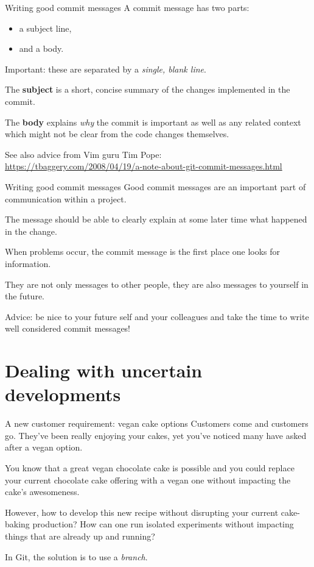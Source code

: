 \documentclass{git_course}
\begin{document}
\begin{frame}[fragile]{Writing good commit messages}
    A commit message has two parts:
    \begin{itemize}
        \item a subject line,
        \item and a body.
    \end{itemize}
    Important: these are separated by a \emph{single, blank line}.

    The \textbf{subject} is a short, concise summary of the changes
    implemented in the commit.

    The \textbf{body} explains \emph{why} the commit is important as well as
    any related context which might not be clear from the code changes
    themselves.

    See also advice from Vim guru Tim Pope:\\
    {\footnotesize \url{https://tbaggery.com/2008/04/19/a-note-about-git-commit-messages.html}}
\end{frame}

\begin{frame}[fragile]{Writing good commit messages}
    Good commit messages are an important part of communication within a
    project.

    The message should be able to clearly explain at some later time what
    happened in the change.

    When problems occur, the commit message is the first place one looks for
    information.

    They are not only messages to other people, they are also messages to
    yourself in the future.

    Advice: be nice to your future self and your colleagues and take the
    time to write well considered commit messages!
\end{frame}

\section{Dealing with uncertain developments}

\begin{frame}[fragile]{A new customer requirement: vegan cake options}
    Customers come and customers go.  They've been really enjoying your
    cakes, yet you've noticed many have asked after a vegan option.

    You know that a great vegan chocolate cake is possible and you could
    replace your current chocolate cake offering with a vegan one without
    impacting the cake's awesomeness.

    However, how to develop this new recipe without disrupting your current
    cake-baking production?  How can one run isolated experiments
    without impacting things that are already up and running?

    In Git, the solution is to use a \emph{branch}.
\end{frame}
\end{document}
